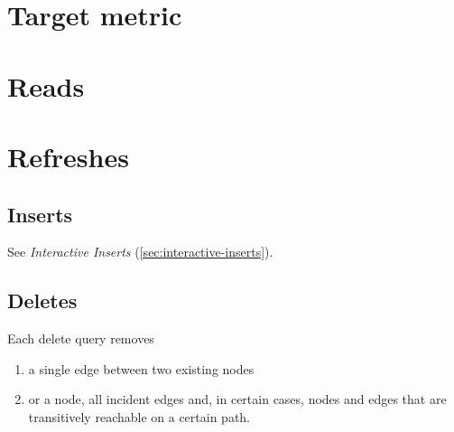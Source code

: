 \section{Target metric}
\label{sec:bi-target-metric}


\section{Reads}
\label{sec:bi-reads}




\section{Refreshes}
\label{sec:bi-refreshes}

\subsection{Inserts}
\label{sec:bi-inserts}

See \emph{Interactive Inserts} (\autoref{sec:interactive-inserts}).

\subsection{Deletes}
\label{sec:bi-deletes}

Each delete query removes

\begin{enumerate}
    \item a single edge between two existing nodes
    \item or a node, all incident edges and, in certain cases, nodes and edges that are transitively reachable on a certain path.
\end{enumerate}


